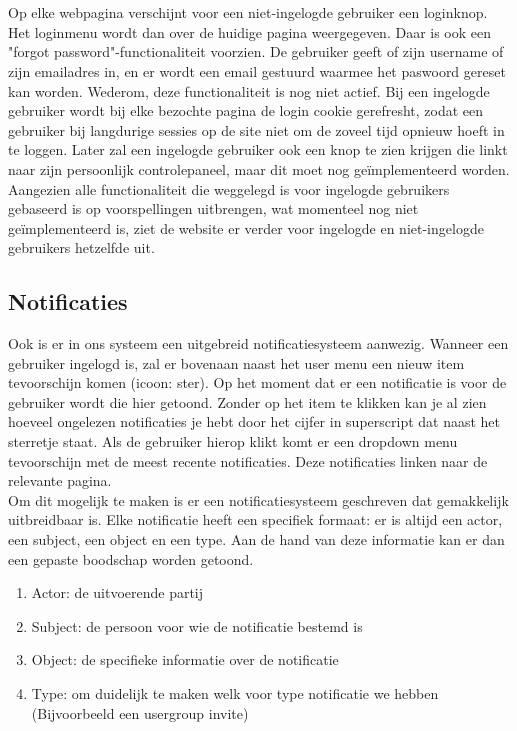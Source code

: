 \documentclass[11pt, a4paper]{article}
\begin{document}
\\
\\
Op elke webpagina verschijnt voor een niet-ingelogde gebruiker een loginknop. Het loginmenu wordt dan over de huidige pagina weergegeven. Daar is ook een "forgot password"-functionaliteit voorzien. De gebruiker geeft of zijn username of zijn emailadres in, en er wordt een email gestuurd waarmee het paswoord gereset kan worden. Wederom, deze functionaliteit is nog niet actief. Bij een ingelogde gebruiker wordt bij elke bezochte pagina de login cookie gerefresht, zodat een gebruiker bij langdurige sessies op de site niet om de zoveel tijd opnieuw hoeft in te loggen. Later zal een ingelogde gebruiker ook een knop te zien krijgen die linkt naar zijn persoonlijk controlepaneel, maar dit moet nog ge\"implementeerd worden. Aangezien alle functionaliteit die weggelegd is voor ingelogde gebruikers gebaseerd is op voorspellingen uitbrengen, wat momenteel nog niet ge\"implementeerd is, ziet de website er verder voor ingelogde en niet-ingelogde gebruikers hetzelfde uit.


\subsection{Notificaties}
Ook is er in ons systeem een uitgebreid notificatiesysteem aanwezig. Wanneer een gebruiker ingelogd is, zal er bovenaan naast het user menu een nieuw item tevoorschijn komen (icoon: ster). Op het moment dat er een notificatie is voor de gebruiker wordt die hier getoond. Zonder op het item te klikken kan je al zien hoeveel ongelezen notificaties je hebt door het cijfer in superscript dat naast het sterretje staat. Als de gebruiker hierop klikt komt er een dropdown menu tevoorschijn met de meest recente notificaties. Deze notificaties linken naar de relevante pagina. \\
Om dit mogelijk te maken is er een notificatiesysteem geschreven dat gemakkelijk uitbreidbaar is. Elke notificatie heeft een specifiek formaat: er is altijd een actor, een subject, een object en een type. Aan de hand van deze informatie kan er dan een gepaste boodschap worden getoond.
\begin{enumerate}
\item Actor: de uitvoerende partij
\item Subject: de persoon voor wie de notificatie bestemd is
\item Object: de specifieke informatie over de notificatie
\item Type: om duidelijk te maken welk voor type notificatie we hebben (Bijvoorbeeld een usergroup invite)
\end{enumerate}
\end{document}
